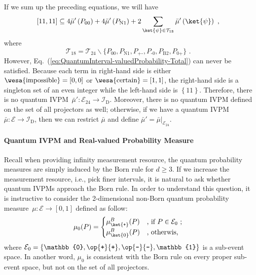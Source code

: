 \documentclass[english,reprint, aps, prl,superscriptaddress, showpacs,
showkeys, longbibliography, amsmath, amssymb]{revtex4-1}
\theoremstyle{plain}
\theoremstyle{definition}
\newcommand{\events}{\ensuremath{\mathcal{E}}}
\newcommand{\imposs}{{\text{\wesa{impossible}}}}
\newcommand{\necess}{{\text{\wesa{certain}}}}
\newcommand{\proj}[1]{\op{#1}{#1}}
\newcommand{\ps}{\texttt{+}}
\newcommand{\ms}{\texttt{-}}
\begin{document}
If we sum up the preceding equations, we will have
\begin{equation}
\left[11,11\right]\subseteq4\bar{\mu}'\left(P_{00}\right)+4\bar{\mu}'\left(P_{\textrm{N}1}\right)+2\sum_{\ket{\psi}\in\mathcal{T}_{18}}\bar{\mu}'\left(\ket{\psi}\right)\textrm{ ,}\label{eq:QuantumInterval-valuedProbability-Total}
\end{equation}
where 
\begin{equation}
\mathcal{T}_{18}=\mathcal{T}_{24}\backslash\{P_{00},P_{\textrm{N}1},P_{\ps\ms},P_{\ms0},P_{\textrm{B}2},P_{0\ps}\}\textrm{ .}
\end{equation}
However, Eq.~(\ref{eq:QuantumInterval-valuedProbability-Total})
can never be satisfied. Because each term in right-hand side is either
$\imposs=\left[0,0\right]$ or $\necess=\left[1,1\right]$, the right-hand
side is a singleton set of an even integer while the left-hand side
is $\left\{ 11\right\} $. Therefore, there is no quantum IVPM~$\bar{\mu}':\events_{24}\rightarrow\mathscr{I}_{\mathrm{D}}$.
Moreover, there is no quantum IVPM defined on the set of all projectors
as well; otherwise, if we have a quantum IVPM~$\bar{\mu}:\events\rightarrow\mathscr{I}_{\mathrm{D}}$,
then we can restrict $\bar{\mu}$ and define $\bar{\mu}'=\left.\bar{\mu}\right|_{\events_{24}}$.

\paragraph{Quantum IVPM and Real-valued Probability Measure}

Recall when providing infinity measurement resource, the quantum probability
measures are simply induced by the Born rule for $d\ge3$. If we increase
the measurement resource, i.e., pick finer intervals, it is natural
to ask whether quantum IVPMs approach the Born rule. In order to understand
this question, it is instructive to consider the 2-dimensional non-Born
quantum probability measure~$\mu:\events\rightarrow[0,1]$ defined
as follow:
\begin{equation}
\mu_{0}(P)=\begin{cases}
\mu_{\ket{\ps}}^{B}(P) & \textrm{, if }P\in\events_{0}\textrm{ ;}\\
\mu_{\ket{0}}^{B}(P) & \textrm{, otherwis,}
\end{cases}
\end{equation}
where $\events_{0}=\left\{ \mathbb{0},\proj{\ps},\proj{\ms},\mathbb{1}\right\} $
is a sub-event space. In another word, $\mu_{0}$ is consistent with
the Born rule on every proper sub-event space, but not on the set
of all projectors.
\end{document}
